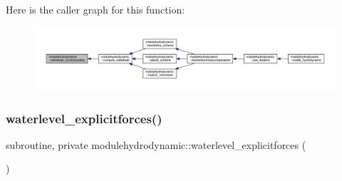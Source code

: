 Here is the caller graph for this function\+:\nopagebreak
\begin{figure}[H]
\begin{center}
\leavevmode
\includegraphics[width=350pt]{namespacemodulehydrodynamic_a07cbcb571bac038116c36df1b277df63_icgraph}
\end{center}
\end{figure}
\mbox{\label{namespacemodulehydrodynamic_a8f55c0f844c6c92f25d99d0c16b764df}} 
\subsubsection{\texorpdfstring{waterlevel\+\_\+explicitforces()}{waterlevel\_explicitforces()}}
{\footnotesize\ttfamily subroutine, private modulehydrodynamic\+::waterlevel\+\_\+explicitforces (\begin{DoxyParamCaption}{ }\end{DoxyParamCaption})\hspace{0.3cm}{\ttfamily [private]}}

